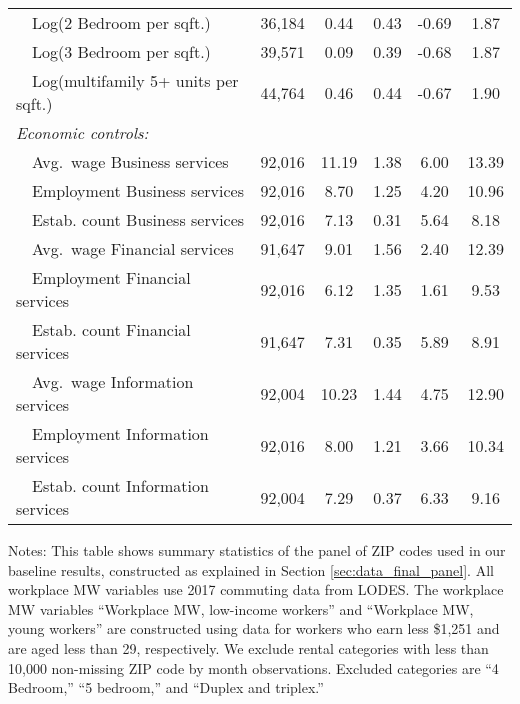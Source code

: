 \begin{table}[hbt!]
\begin{tabular}{@{}lccccc@{}}
        $\quad$Log(2 Bedroom per sqft.)               & 36,184  & 0.44  & 0.43  & -0.69  & 1.87  \\
        $\quad$Log(3 Bedroom per sqft.)               & 39,571  & 0.09  & 0.39  & -0.68  & 1.87  \\
        $\quad$Log(multifamily 5+ units per sqft.)    & 44,764  & 0.46  & 0.44  & -0.67  & 1.90  \\[.3em]
        \textit{Economic controls:}                   &       &       &       &       &       \\
        $\quad$Avg.\ wage Business services           & 92,016  & 11.19  & 1.38  & 6.00  & 13.39  \\
        $\quad$Employment Business services           & 92,016  & 8.70  & 1.25  & 4.20  & 10.96  \\
        $\quad$Estab. count Business services         & 92,016  & 7.13  & 0.31  & 5.64  & 8.18  \\
        $\quad$Avg.\ wage Financial services          & 91,647  & 9.01  & 1.56  & 2.40  & 12.39  \\
        $\quad$Employment Financial services          & 92,016  & 6.12  & 1.35  & 1.61  & 9.53  \\
        $\quad$Estab. count Financial services        & 91,647  & 7.31  & 0.35  & 5.89  & 8.91  \\
        $\quad$Avg.\ wage Information services        & 92,004  & 10.23  & 1.44  & 4.75  & 12.90  \\
        $\quad$Employment Information services        & 92,016  & 8.00  & 1.21  & 3.66  & 10.34  \\
        $\quad$Estab. count Information services      & 92,004  & 7.29  & 0.37  & 6.33  & 9.16  \\ \bottomrule
    \end{tabular}

    \begin{minipage}{.95\textwidth} \footnotesize
        \vspace{2mm}
        Notes: This table shows summary statistics of the panel of ZIP codes 
        used in our baseline results, constructed as explained in Section 
        \ref{sec:data_final_panel}.
        All workplace MW variables use 2017 commuting data from LODES.
        The workplace MW variables ``Workplace MW, low-income workers'' and 
        ``Workplace MW, young workers'' are constructed using data for 
        workers who earn less \$1,251 and are aged less than 29, respectively.
        We exclude rental categories with less than 10,000 non-missing ZIP code 
        by month observations.
        Excluded categories are ``4 Bedroom,'' ``5 bedroom,'' and 
        ``Duplex and triplex.''
    \end{minipage}
\end{table}
